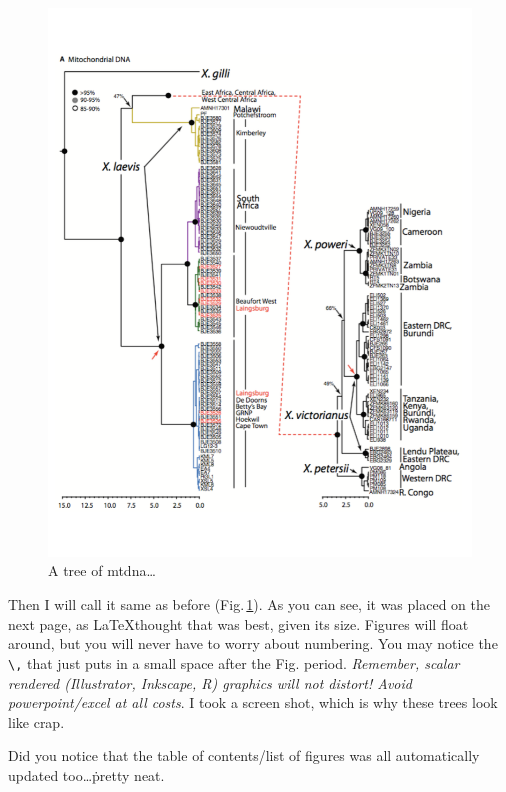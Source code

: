 \begin{figure}[h!] %
	\centering
	\includegraphics[scale=0.6]{Figs/Tree_Fig.pdf}
    \caption[Tree]{A tree of \ac{mtdna}\ldots}
    \label{Tree}
\end{figure}

Then I will call it same as before (Fig.\,\ref{Tree}). As you can see, it was placed on the next page, as \LaTeX thought that was best, given its size. Figures will float around, but you will never have to worry about numbering. You may notice the \verb+\,+ that just puts in a small space after the Fig. period. \emph{Remember, scalar rendered (Illustrator, Inkscape, R) graphics will not distort! Avoid powerpoint/excel at all costs}. I took a screen shot, which is why these trees look like crap. 

Did you notice that the table of contents/list of figures was all automatically updated too\ldots\.pretty neat. 


